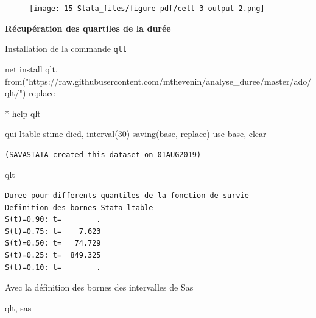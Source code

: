 \documentclass[
  12pt,
  letterpaper,
  DIV=11,
  numbers=noendperiod,
  onepage,
  openany]{scrreprt}
\newenvironment{Shaded}{\begin{snugshade}}{\end{snugshade}}
\newcommand{\KeywordTok}[1]{\textcolor[rgb]{0.94,0.87,0.69}{#1}}
\newcommand{\NormalTok}[1]{\textcolor[rgb]{0.80,0.80,0.80}{#1}}
\newcommand{\StringTok}[1]{\textcolor[rgb]{0.80,0.58,0.58}{#1}}
\begin{document}
\begin{figure}[H]

{\centering \texttt{[image: 15-Stata\_files/figure-pdf/cell-3-output-2.png]}

}

\end{figure}

\textbf{Récupération des quartiles de la durée}

Installation de la commande \texttt{qlt}

\begin{Shaded}
\begin{Highlighting}[]
\NormalTok{net install qlt, from(}\StringTok{"https://raw.githubusercontent.com/mthevenin/analyse\_duree/master/ado/qlt/"}\NormalTok{) }\KeywordTok{replace}

\NormalTok{* }\KeywordTok{help}\NormalTok{ qlt}
\end{Highlighting}
\end{Shaded}

\begin{Shaded}
\begin{Highlighting}[]
\KeywordTok{qui} \KeywordTok{ltable}\NormalTok{ stime died, interval(30) }\KeywordTok{saving}\NormalTok{(base, }\KeywordTok{replace}\NormalTok{)}
\KeywordTok{use}\NormalTok{ base, }\KeywordTok{clear}
\end{Highlighting}
\end{Shaded}

\begin{verbatim}
(SAVASTATA created this dataset on 01AUG2019)
\end{verbatim}

\begin{Shaded}
\begin{Highlighting}[]
\NormalTok{qlt}
\end{Highlighting}
\end{Shaded}

\begin{verbatim}
Duree pour differents quantiles de la fonction de survie
Definition des bornes Stata-ltable
S(t)=0.90: t=        .
S(t)=0.75: t=    7.623
S(t)=0.50: t=   74.729
S(t)=0.25: t=  849.325
S(t)=0.10: t=        .
\end{verbatim}

Avec la définition des bornes des intervalles de Sas

\begin{Shaded}
\begin{Highlighting}[]
\NormalTok{qlt, sas}
\end{Highlighting}
\end{Shaded}
\end{document}
